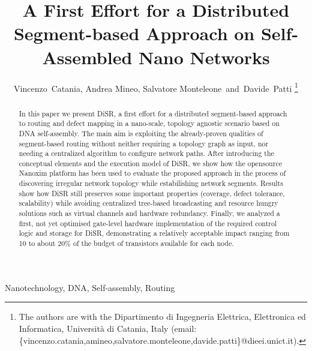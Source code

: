 \documentclass[final,journal,letterpaper]{IEEEtran}
\begin{document}

\title{A First Effort for a Distributed Segment-based Approach on Self-Assembled Nano Networks} 

\author{Vincenzo~Catania, Andrea Mineo, Salvatore Monteleone~and~Davide~Patti%
\thanks{The authors are with the Dipartimento di Ingegneria
Elettrica, Elettronica ed Informatica, Universit\`a di Catania, Italy
(email: \{vincenzo.catania,amineo,salvatore.monteleone,davide.patti\}@dieei.unict.it).}}

\maketitle


\begin{abstract}
In this paper we present DiSR, a first effort for a distributed
segment-based approach to routing and defect mapping in a nano-scale,
topology agnostic scenario based on DNA self-assembly. The main aim is
exploiting the already-proven qualities of segment-based routing
without neither requiring a topology graph as input, nor needing a
centralized algorithm to configure network paths.  After introducing
the conceptual elements and the execution model of DiSR, we show how
the opensource Nanoxim platform has been used to evaluate the proposed
approach in the process of discovering irregular network topology
while estabilishing network segments.  Results show how DiSR still
preserves some important properties (coverage, defect tolerance,
scalability)  while avoiding centralized tree-based broadcasting and
resource hungry solutions such as virtual channels and hardware
redundancy. Finally, we analyzed a first, not yet optimised gate-level
hardware implementation of the required control logic and storage for
DiSR, demonstrating a relatively acceptable impact ranging from 10 to
about 20\% of the budget of transistors available for each node.
\end{abstract}


\begin{IEEEkeywords}
Nanotechnology, DNA, Self-assembly, Routing
\end{IEEEkeywords}
\end{document}
